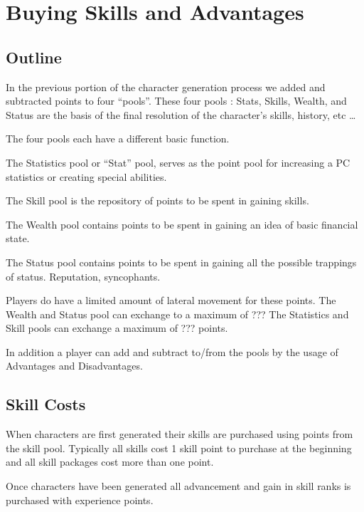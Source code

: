 \chapter{Buying Skills and Advantages}

\section{Outline}

In the previous portion of the character generation process we added 
and subtracted points to four ``pools''. These four pools : Stats, 
Skills, Wealth, and Status are the basis of the final resolution of 
the character's skills, history, etc \dots

The four pools each have a different basic function.

The Statistics pool or ``Stat'' pool, serves as the point pool for 
increasing a PC statistics or creating special abilities.

The Skill pool is the repository of points to be spent in gaining 
skills.

The Wealth pool contains points to be spent in gaining an idea of 
basic financial state.

The Status pool contains points to be spent in gaining all the 
possible trappings of status. Reputation, syncophants.

Players do have a limited amount of lateral movement for these 
points. The Wealth and Status pool can exchange to a maximum of ???
The Statistics and Skill pools can exchange a maximum of ???
points.

In addition a player can add and subtract to/from the pools by the 
usage of Advantages and Disadvantages.

\section{Skill Costs}

When characters are first generated their skills are purchased 
using points from the skill pool. Typically all skills cost 1 skill
point to purchase at the beginning and all skill packages cost more than
one point. 

Once characters have been generated all advancement and gain in skill
ranks is purchased with experience points.

